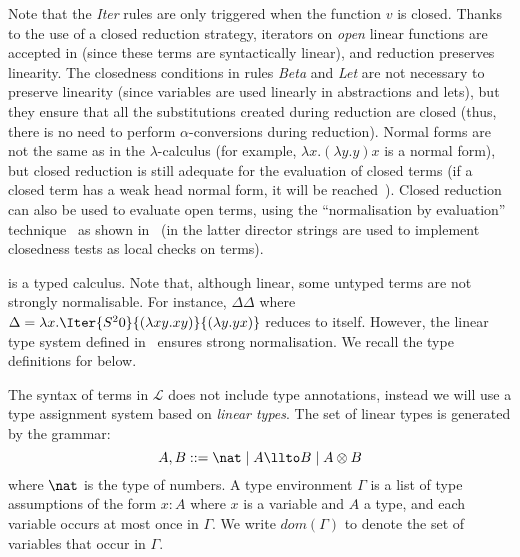 \documentclass{article}
\begin{document}
Note that the \emph{Iter} rules are only triggered when the function
$v$ is closed. Thanks to the use of a closed reduction strategy,
iterators on \emph{open} linear functions are accepted in \LLCI (since
these terms are syntactically linear), and reduction preserves
linearity. The  closedness conditions in rules \emph{Beta} and
\emph{Let} are not necessary to preserve linearity (since variables
are used linearly in abstractions and lets), but they ensure that all
the substitutions created during reduction are closed (thus, there is
no need to perform $\alpha$-conversions during reduction).  Normal
forms are not the same as in the $\lambda$-calculus (for example,
$\lambda x.(\lambda y.y)x$ is a normal form), but closed reduction is
still adequate for the evaluation of closed terms (if a closed term has a
weak head normal form, it will be reached~\cite{AlvesS:TCS}).  Closed
reduction can also be used to evaluate open terms, using the
``normalisation by evaluation'' technique~\cite{BergerU91} as shown
in~\cite{fernandezM:clores, FernandezM:aaecc05} (in the latter
director strings are used to implement closedness tests as local
checks on terms).



\LLCI is a typed calculus. Note that, although linear, some untyped terms are not strongly normalisable. For
instance, $\Delta \Delta$ where $\Delta = \lambda x. \Iter {S^2 0} {(\lambda xy.xy)}{ (\lambda y.yx)}$ reduces to itself. 
However, the linear type system defined in~\cite{AlvesS:TCS} ensures strong normalisation. We recall the type definitions for \LLCI below.

The syntax of terms in $\mathcal{L}$ does not include type annotations,
instead we will use a type assignment system based on \emph{linear
  types}.  The set of linear types is generated by the grammar:
\[
A,B ::= \nat \mid 
A \llto B \mid  A \otimes B
\]
where $\nat$ is the type of numbers. A type environment $\Gamma$ is a
list of type assumptions of the form $x:A$ where $x$ is a variable and
$A$ a type, and each variable occurs at most once in $\Gamma$.  We
write $dom(\Gamma)$ to denote the set of variables that occur in
$\Gamma$.
\end{document}
